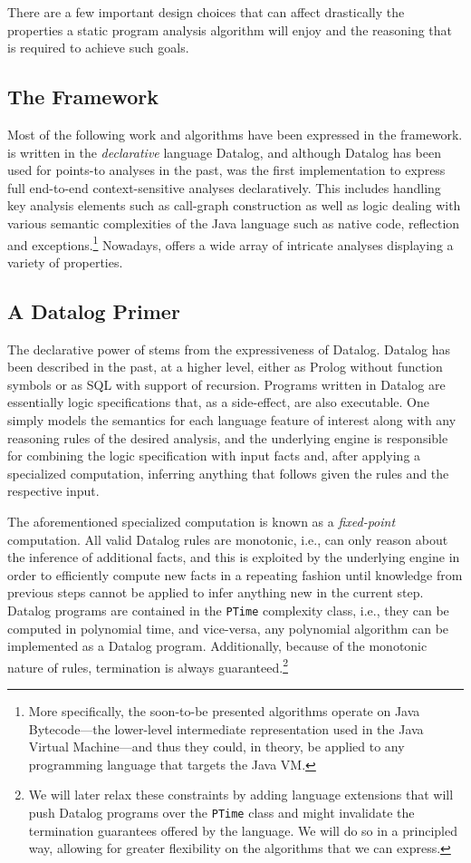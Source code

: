 There are a few important design choices that can affect drastically the
properties a static program analysis algorithm will enjoy and the reasoning
that is required to achieve such goals.


\subsection{The \doop{} Framework}

Most of the following work and algorithms have been expressed in the \doop{} framework. \doop{} is written in the \emph{declarative} language Datalog, and although Datalog has been used for points-to analyses in the past, \doop{} was the first implementation to express full end-to-end context-sensitive analyses declaratively. This includes handling key analysis elements such as call-graph construction as well as logic dealing with various semantic complexities of the Java language such as native code, reflection and exceptions.\footnote{More specifically, the soon-to-be presented algorithms operate on Java Bytecode---the lower-level intermediate representation used in the Java Virtual Machine---and thus they could, in theory, be applied to any programming language that targets the Java VM.} Nowadays, \doop{} offers a wide array of intricate analyses displaying a variety of properties.

\subsection{A Datalog Primer}

The declarative power of \doop{} stems from the expressiveness of Datalog. Datalog has been described in the past, at a higher level, either as Prolog without function symbols or as SQL with support of recursion. Programs written in Datalog are essentially logic specifications that, as a side-effect, are also executable. One simply models the semantics for each language feature of interest along with any reasoning rules of the desired analysis, and the underlying engine is responsible for combining the logic specification with input facts and, after applying a specialized computation, inferring anything that follows given the rules and the respective input.

The aforementioned specialized computation is known as a \emph{fixed-point} computation. All valid Datalog rules are monotonic, i.e., can only reason about the inference of additional facts, and this is exploited by the underlying engine in order to efficiently compute new facts in a repeating fashion until knowledge from previous steps cannot be applied to infer anything new in the current step. Datalog programs are contained in the \texttt{PTime} complexity class, i.e., they can be computed in polynomial time, and vice-versa, any polynomial algorithm can be implemented as a Datalog program. Additionally, because of the monotonic nature of rules, termination is always guaranteed.\footnote{We will later relax these constraints by adding language extensions that will push Datalog programs over the \texttt{PTime} class and might invalidate the termination guarantees offered by the language. We will do so in a principled way, allowing for greater flexibility on the algorithms that we can express.}

